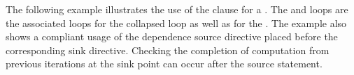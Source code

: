 


The following example illustrates the use of the  clause for
a .  The  and  loops are the associated
loops for the collapsed loop as well as for the .
The example also shows a compliant usage of the dependence source
directive placed before the corresponding sink directive.
Checking the completion of computation from previous iterations at the sink point can occur after the source statement.


